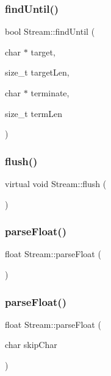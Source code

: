 \mbox{\label{class_stream_a3a9497de614792103ab8cb4759e01a69}} 
\subsubsection{find\+Until()\hspace{0.1cm}{\footnotesize\ttfamily [2/2]}}
{\footnotesize\ttfamily bool Stream\+::find\+Until (\begin{DoxyParamCaption}\item[{char $\ast$}]{target,  }\item[{size\+\_\+t}]{target\+Len,  }\item[{char $\ast$}]{terminate,  }\item[{size\+\_\+t}]{term\+Len }\end{DoxyParamCaption})}

\mbox{\label{class_stream_aa3ef2c34f152a0b2ea8de9139b9461da}} 
\subsubsection{flush()}
{\footnotesize\ttfamily virtual void Stream\+::flush (\begin{DoxyParamCaption}{ }\end{DoxyParamCaption})\hspace{0.3cm}{\ttfamily [pure virtual]}}

\mbox{\label{class_stream_a5e5a0cc11eb586d89dcb7fa8e53a87e8}} 
\subsubsection{parse\+Float()\hspace{0.1cm}{\footnotesize\ttfamily [1/2]}}
{\footnotesize\ttfamily float Stream\+::parse\+Float (\begin{DoxyParamCaption}{ }\end{DoxyParamCaption})}

\mbox{\label{class_stream_a14a98cdbb166008f25dd044d836b1864}} 
\subsubsection{parse\+Float()\hspace{0.1cm}{\footnotesize\ttfamily [2/2]}}
{\footnotesize\ttfamily float Stream\+::parse\+Float (\begin{DoxyParamCaption}\item[{char}]{skip\+Char }\end{DoxyParamCaption})\hspace{0.3cm}{\ttfamily [protected]}}


